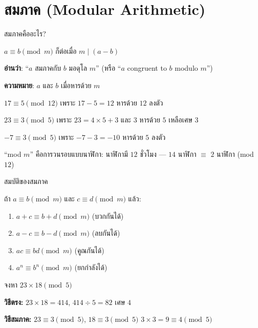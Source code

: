 \documentclass[11pt, aspectratio=169]{beamer}
\begin{document}
\section{สมภาค (Modular Arithmetic)}

\begin{frame}{สมภาคคืออะไร?}
  \begin{explanation}[นิยาม]
    $a \equiv b \pmod{m}$ \quad ก็ต่อเมื่อ \quad $m \mid (a - b)$

    \medskip
    \textbf{อ่านว่า}: ``$a$ สมภาคกับ $b$ มอดุโล $m$'' (หรือ ``$a$ congruent to $b$ modulo $m$'')

    \textbf{ความหมาย}: $a$ และ $b$  เมื่อหารด้วย $m$
  \end{explanation}

  \begin{exambox}[ตัวอย่าง]
    $17 \equiv 5 \pmod{12}$ \quad เพราะ \quad $17 - 5 = 12$ หารด้วย $12$ ลงตัว

    $23 \equiv 3 \pmod{5}$ \quad เพราะ \quad $23 = 4\times5 + 3$ และ $3$ หารด้วย $5$ เหลือเศษ $3$

    $-7 \equiv 3 \pmod{5}$ \quad เพราะ \quad $-7 - 3 = -10$ หารด้วย $5$ ลงตัว
  \end{exambox}

  \begin{intuition}[คิดง่าย ๆ]
    ``mod $m$'' คือการวนรอบแบบนาฬิกา: นาฬิกามี $12$ ชั่วโมง
    — $14$ นาฬิกา $\equiv$ $2$ นาฬิกา (mod $12$)
  \end{intuition}
\end{frame}

\begin{frame}{สมบัติของสมภาค}
  \begin{explanation}
    ถ้า $a \equiv b \pmod{m}$ และ $c \equiv d \pmod{m}$ แล้ว:
    \begin{enumerate}
      \item $a + c \equiv b + d \pmod{m}$ \quad (บวกกันได้)
      \item $a - c \equiv b - d \pmod{m}$ \quad (ลบกันได้)
      \item $ac \equiv bd \pmod{m}$ \quad (คูณกันได้)
      \item $a^n \equiv b^n \pmod{m}$ \quad (ยกกำลังได้)
    \end{enumerate}
  \end{explanation}

  \begin{exambox}
    จงหา $23 \times 18 \pmod{5}$

    \textbf{วิธีตรง:} $23 \times 18 = 414$, $414 \div 5 = 82$ เศษ $4$

    \textbf{วิธีสมภาค:} $23 \equiv 3 \pmod{5}$, $18 \equiv 3 \pmod{5}$ \qquad $3 \times 3 = 9 \equiv 4 \pmod{5}$ \quad {}
  \end{exambox}
\end{frame}
\end{document}
